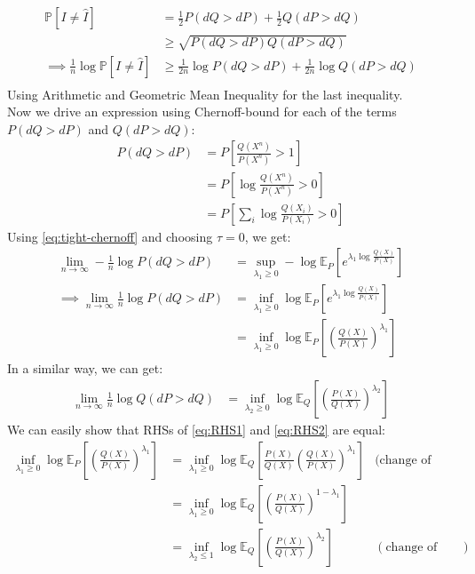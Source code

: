 \documentclass{article}
\numberwithin{equation}{section}
\newcommand{\EX}[2][]{\mathbb{E}_{#1}\left[#2\right]}%
\newcommand{\prob}[1]{\mathbb{P}\left[#1\right]}%
\begin{document}
\begin{align}
\prob{I \neq \hat{I}} &= \frac{1}{2} P(dQ > dP) + \frac{1}{2} Q(dP > dQ)\\
&\ge \sqrt{P(dQ > dP)Q(dP > dQ)}\\
\implies \frac{1}{n}\log \prob{I \neq \hat{I}} &\ge \frac{1}{2n} \log P(dQ > dP) + \frac{1}{2n} \log Q(dP > dQ)\\
\label{eq:log-error}
\end{align}
Using Arithmetic and Geometric Mean Inequality for the last inequality.\\
Now we drive an expression using Chernoff-bound for each of the terms \(P(dQ > dP)\) and \(Q(dP > dQ)\):
\begin{align}
P(dQ > dP)
&= P\left[\frac{Q(X^n)}{P(X^n)} > 1\right]\\
&= P\left[\log \frac{Q(X^n)}{P(X^n)} > 0\right]\\
&= P\left[\sum_i \log \frac{Q(X_i)}{P(X_i)} > 0\right]
\end{align}
Using \eqref{eq:tight-chernoff} and choosing \(\tau = 0\), we get:
\begin{align}
\lim_{n \to \infty}-\frac{1}{n}\log P(dQ > dP) &= \sup_{\lambda_1 \ge 0} - \log \EX[P]{e^{\lambda_1 \log \frac{Q(X)}{P(X)}}}\\
\implies \lim_{n \to \infty} \frac{1}{n}\log P(dQ > dP) &= \inf_{\lambda_1 \ge 0} \log \EX[P]{e^{\lambda_1 \log \frac{Q(X)}{P(X)}}}\\
&= \inf_{\lambda_1 \ge 0} \log \EX[P]{\left(\frac{Q(X)}{P(X)}\right)^{\lambda_1}}
\label{eq:RHS1}
\end{align}
In a similar way, we can get:
\begin{align}
\lim_{n \to \infty}\frac{1}{n}\log Q(dP > dQ) &= \inf_{\lambda_2 \ge 0} \log \EX[Q]{\left(\frac{P(X)}{Q(X)}\right)^{\lambda_2}}
\label{eq:RHS2}
\end{align}
We can easily show that RHSs of \eqref{eq:RHS1} and \eqref{eq:RHS2} are equal:
\begin{align}
\inf_{\lambda_1 \ge 0} \log \EX[P]{\left(\frac{Q(X)}{P(X)}\right)^{\lambda_1}} &= \inf_{\lambda_1 \ge 0} \log \EX[Q]{\frac{P(X)}{Q(X)} \left(\frac{Q(X)}{P(X)}\right)^{\lambda_1}} & \text{(change of measure)}\\
&= \inf_{\lambda_1 \ge 0} \log \EX[Q]{\left(\frac{P(X)}{Q(X)}\right)^{1-\lambda_1}}\\
&= \inf_{\lambda_2 \le 1} \log \EX[Q]{\left(\frac{P(X)}{Q(X)}\right)^{\lambda_2}} & (\text{change of variable})
\end{align}
\end{document}
